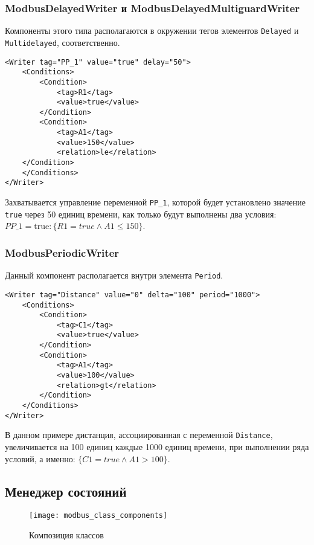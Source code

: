 \subsubsection{ModbusDelayedWriter и ModbusDelayedMultiguardWriter}
Компоненты этого типа располагаются в окружении тегов элементов \texttt{Delayed} и \texttt{Multidelayed}, соответственно.
\begin{lstlisting}
<Writer tag="PP_1" value="true" delay="50">
    <Conditions>
        <Condition>
            <tag>R1</tag>
            <value>true</value>
        </Condition>
        <Condition>
            <tag>A1</tag>
            <value>150</value>
            <relation>le</relation>
    </Condition>
    </Conditions>
</Writer>
\end{lstlisting}
Захватывается управление переменной \texttt{PP\_1}, которой будет установлено значение \texttt{true}
через 50 единиц времени, как только будут выполнены два условия:
$PP\_1 = \mbox{true}: \{R1 = true \wedge A1 \le 150\}$.


\subsubsection{ModbusPeriodicWriter}
Данный компонент располагается внутри элемента \texttt{Period}.
\begin{lstlisting}
<Writer tag="Distance" value="0" delta="100" period="1000">
    <Conditions>
        <Condition>
            <tag>C1</tag>
            <value>true</value>
        </Condition>
        <Condition>
            <tag>A1</tag>
            <value>100</value>
            <relation>gt</relation>
        </Condition>
    </Conditions>
</Writer>
\end{lstlisting}
В данном примере дистанция, ассоциированная с переменной \texttt{Distance}, увеличивается на 100 единиц каждые 1000 единиц времени,
при выполнении ряда условий, а именно:
$\{C1 = true \wedge A1 > 100\}$.




\subsection{Менеджер состояний}
\begin{center}
    \begin{figure}
        \texttt{[image: modbus\_class\_components]}
        \caption{Композиция классов}\label{fig:modbus_class_components}
    \end{figure}
\end{center}

